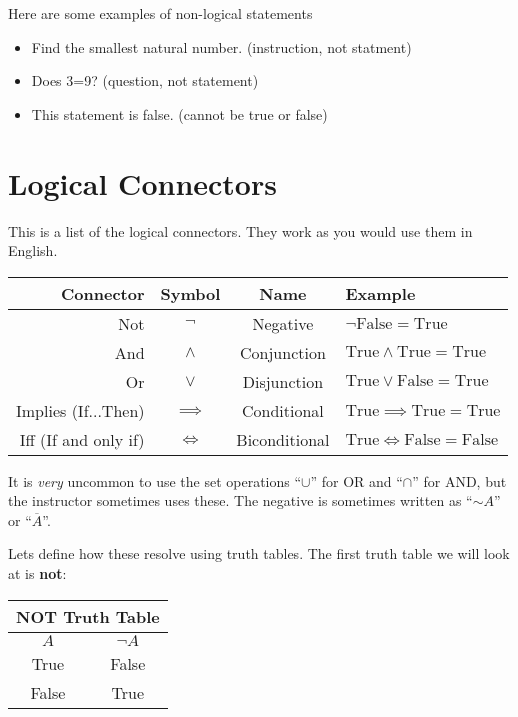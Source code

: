 \begin{boxexample}{}{}
	Here are some examples of non-logical statements
	\begin{itemize}
		\item Find the smallest natural number. (instruction, not statment)
		\item Does 3=9? (question, not statement)
		\item This statement is false. (cannot be true or false)
	\end{itemize}
\end{boxexample}

\section{Logical Connectors}

This is a list of the logical connectors. They work as you would use them in English.

\medskip
\begin{tabular}{r|c|c|l}
	\hline
	Connector & Symbol & Name & Example\\
	\hline
	Not & $\neg$ & Negative & $\neg \text{False} = \text{True}$\\
	And & $\land$ & Conjunction & $\text{True} \land \text{True} = \text{True} $\\
	Or & $\lor$ & Disjunction & $\text{True} \lor \text{False} = \text{True}$\\
	Implies (If...Then) & $\implies$ & Conditional & $\text{True} \implies \text{True} = \text{True}$\\
	Iff (If and only if) & $\iff$ & Biconditional & $\text{True} \iff \text{False} = \text{False}$\\
\hline
\end{tabular}
\medskip

\begin{boxnotation*}{}{}
	It is \emph{very} uncommon to use the set operations ``$\cup$'' for OR and ``$\cap$'' for AND, but the instructor sometimes uses these. The negative is sometimes written as ``$\sim A$'' or ``$\overline A$''.
\end{boxnotation*}

Lets define how these resolve using truth tables. The first truth table we will look at is {\bf not}:

\medskip
\begin{tabular}{c|c}
	\hline
	\multicolumn{2}{c}{NOT Truth Table}\\
	\hline
	$A$ & $\neg A$\\
	\hline
	True & False\\
	False & True\\
	\hline
\end{tabular}
\medskip

